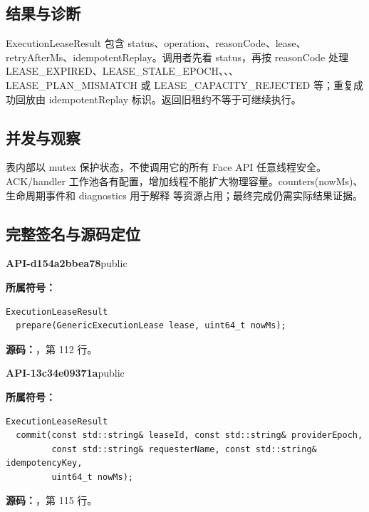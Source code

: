\subsection{结果与诊断}
ExecutionLeaseResult 包含 status、operation、reasonCode、lease、retryAfterMs、idempotentReplay。调用者先看 status，再按 reasonCode 处理 LEASE\_EXPIRED、LEASE\_STALE\_EPOCH、、、LEASE\_PLAN\_MISMATCH 或 LEASE\_CAPACITY\_REJECTED 等；重复成功回放由 idempotentReplay 标识。返回旧租约不等于可继续执行。

\subsection{并发与观察}
表内部以 mutex 保护状态，不使调用它的所有 Face API 任意线程安全。ACK/handler 工作池各有配置，增加线程不能扩大物理容量。counters(nowMs)、生命周期事件和 diagnostics 用于解释  等资源占用；最终完成仍需实际结果证据。

\subsection{完整签名与源码定位}

\textbf{API-d154a2bbea78}\quad public\par
\textbf{所属符号：}\par
\begin{Verbatim}[fontsize=\footnotesize,breaklines,breakanywhere]
ExecutionLeaseResult
  prepare(GenericExecutionLease lease, uint64_t nowMs);
\end{Verbatim}
\textbf{源码：}，第 112 行。\par

\textbf{API-13c34e09371a}\quad public\par
\textbf{所属符号：}\par
\begin{Verbatim}[fontsize=\footnotesize,breaklines,breakanywhere]
ExecutionLeaseResult
  commit(const std::string& leaseId, const std::string& providerEpoch,
         const std::string& requesterName, const std::string& idempotencyKey,
         uint64_t nowMs);
\end{Verbatim}
\textbf{源码：}，第 115 行。\par

